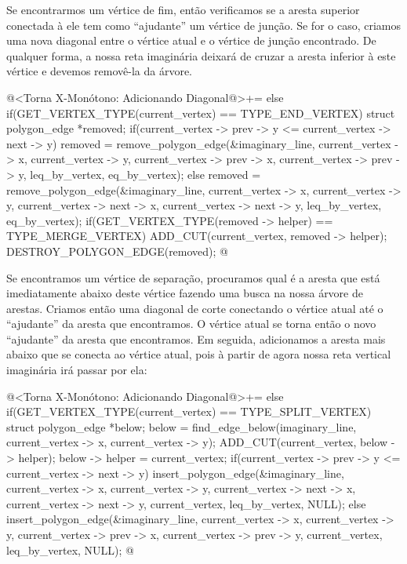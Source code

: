 {{{{{{Se encontrarmos um vértice de fim, então verificamos se a aresta
superior conectada à ele tem como ``ajudante'' um vértice de
junção. Se for o caso, criamos uma nova diagonal entre o vértice atual
e o vértice de junção encontrado. De qualquer forma, a nossa reta
imaginária deixará de cruzar a aresta inferior à este vértice e
devemos removê-la da árvore.

\iniciocodigo
@<Torna X-Monótono: Adicionando Diagonal@>+=
else if(GET_VERTEX_TYPE(current_vertex) == TYPE_END_VERTEX){
  struct polygon_edge *removed;
  if(current_vertex -> prev -> y <= current_vertex -> next -> y){
    removed = remove_polygon_edge(&imaginary_line, current_vertex -> x,
                                 current_vertex -> y,
                                 current_vertex -> prev -> x,
                                 current_vertex -> prev -> y,
                                 leq_by_vertex, eq_by_vertex);
  }
  else{
    removed = remove_polygon_edge(&imaginary_line, current_vertex -> x,
                                 current_vertex -> y,
                                 current_vertex -> next -> x,
                                 current_vertex -> next -> y,
                                 leq_by_vertex, eq_by_vertex);
  }
  if(GET_VERTEX_TYPE(removed -> helper) == TYPE_MERGE_VERTEX){
    ADD_CUT(current_vertex, removed -> helper);
  }
  DESTROY_POLYGON_EDGE(removed);
}
@
\fimcodigo

Se encontramos um vértice de separação, procuramos qual é a aresta que
está imediatamente abaixo deste vértice fazendo uma busca na nossa
árvore de arestas. Criamos então uma diagonal de corte conectando o
vértice atual até o ``ajudante'' da aresta que encontramos. O vértice
atual se torna então o novo ``ajudante'' da aresta que encontramos. Em
seguida, adicionamos a aresta mais abaixo que se conecta ao vértice
atual, pois à partir de agora nossa reta vertical imaginária irá
passar por ela:

\iniciocodigo
@<Torna X-Monótono: Adicionando Diagonal@>+=
else if(GET_VERTEX_TYPE(current_vertex) == TYPE_SPLIT_VERTEX){
  struct polygon_edge *below;
  below = find_edge_below(imaginary_line, current_vertex -> x,
                          current_vertex -> y);
  ADD_CUT(current_vertex, below -> helper);
  below -> helper = current_vertex;
  if(current_vertex -> prev -> y <= current_vertex -> next -> y){
    insert_polygon_edge(&imaginary_line, current_vertex -> x,
                        current_vertex -> y, current_vertex -> next -> x,
                        current_vertex -> next -> y,
                        current_vertex, leq_by_vertex, NULL);
  }
  else{
    insert_polygon_edge(&imaginary_line, current_vertex -> x,
                        current_vertex -> y, current_vertex -> prev -> x,
                        current_vertex -> prev -> y,
                        current_vertex, leq_by_vertex, NULL);
  }
}
@
\fimcodigo

}}}}}}
